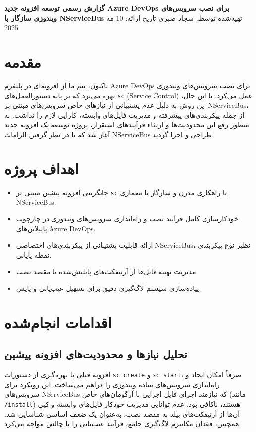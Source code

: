 \documentclass[a4paper,12pt]{article}
\begin{document}
\begin{titlepage}
    \centering
    \vspace*{2cm}
    {\Huge\textbf{گزارش رسمی توسعه افزونه جدید Azure DevOps برای نصب سرویس‌های ویندوزی سازگار با NServiceBus}}
    \vspace{1cm}
    {\Large تهیه‌شده توسط: سجاد صبری}
    \vspace{1cm}
    {\large تاریخ ارائه: 10 مه 2025}
    \vfill
\end{titlepage}

\section*{مقدمه}
تاکنون، تیم ما از افزونه‌ای در پلتفرم Azure DevOps برای نصب سرویس‌های ویندوزی بهره می‌برد که بر پایه دستورالعمل‌های \texttt{sc} (Service Control) عمل می‌کرد. با این حال، این روش به دلیل عدم پشتیبانی از نیازهای خاص سرویس‌های مبتنی بر NServiceBus، از جمله پیکربندی‌های پیشرفته و مدیریت فایل‌های وابسته، کارایی لازم را نداشت. به منظور رفع این محدودیت‌ها و ارتقاء فرآیندهای استقرار، پروژه توسعه یک افزونه جدید آغاز شد که با در نظر گرفتن الزامات NServiceBus طراحی و اجرا گردید.

\section*{اهداف پروژه}
\begin{itemize}
    \item جایگزینی افزونه پیشین مبتنی بر \texttt{sc} با راهکاری مدرن و سازگار با معماری NServiceBus.
    \item خودکارسازی کامل فرآیند نصب و راه‌اندازی سرویس‌های ویندوزی در چارچوب پایپلاین‌های Azure DevOps.
    \item ارائه قابلیت پشتیبانی از پیکربندی‌های اختصاصی NServiceBus، نظیر نوع پیکربندی نقطه پایانی.
    \item مدیریت بهینه فایل‌ها از آرتیفکت‌های پابلیش‌شده تا مقصد نصب.
    \item پیاده‌سازی سیستم لاگ‌گیری دقیق برای تسهیل عیب‌یابی و پایش.
\end{itemize}

\section*{اقدامات انجام‌شده}

\subsection*{تحلیل نیازها و محدودیت‌های افزونه پیشین}
افزونه قبلی با بهره‌گیری از دستورات \texttt{sc create} و \texttt{sc start}، صرفاً امکان ایجاد و راه‌اندازی سرویس‌های ساده ویندوزی را فراهم می‌ساخت. این رویکرد برای سرویس‌های NServiceBus که نیازمند اجرای فایل اجرایی با آرگومان‌های خاص (مانند \texttt{/install}) هستند، ناکافی بود. عدم توانایی مدیریت خودکار فایل‌های وابسته و کپی آن‌ها از آرتیفکت‌های بیلد به مقصد نصب، به‌عنوان یک ضعف اساسی شناسایی شد. همچنین، فقدان مکانیزم لاگ‌گیری جامع، فرآیند عیب‌یابی را با چالش مواجه می‌کرد.
\end{document}
